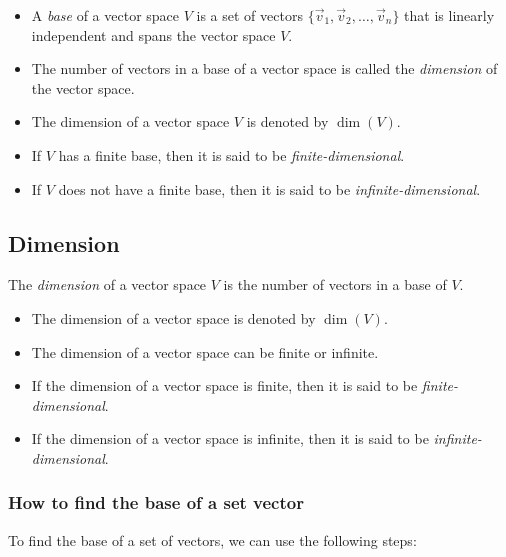\begin{itemize}

	\item A \emph{base} of a vector space \(V\) is a set of vectors 
	      \(\{\vec{v}_1, \vec{v}_2, \ldots, \vec{v}_n\}\) that is linearly independent and 
		  spans the vector space \(V\).

	\item The number of vectors in a base of a vector space is called the \emph{dimension} of the 
	      vector space.

	\item The dimension of a vector space \(V\) is denoted by \(\dim(V)\).

	\item If \(V\) has a finite base, then it is said to be \emph{finite-dimensional}.

	\item If \(V\) does not have a finite base, then it is said to be \emph{infinite-dimensional}.
\end{itemize}

\subsection{Dimension}

The \emph{dimension} of a vector space \(V\) is the number of vectors in a base of \(V\).

\begin{itemize}

	\item The dimension of a vector space is denoted by \(\dim(V)\).

	\item The dimension of a vector space can be finite or infinite.

	\item If the dimension of a vector space is finite, then it is said to be \emph{finite-dimensional}.

	\item If the dimension of a vector space is infinite, then it is said to be \emph{infinite-dimensional}.

\end{itemize}

\subsubsection{How to find the base of a set vector}

To find the base of a set of vectors, we can use the following steps:

